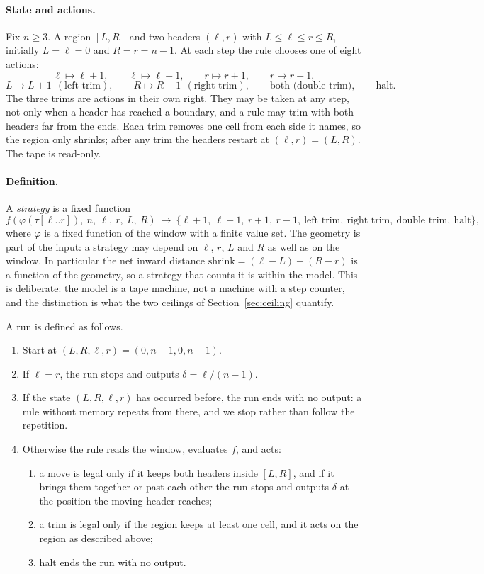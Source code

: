 \documentclass[11pt]{article}
\theoremstyle{remark}
\begin{document}
\paragraph{State and actions.} Fix $n\ge3$. A region $[L,R]$ and two headers $(\ell,r)$ with
$L\le\ell\le r\le R$, initially $L=\ell=0$ and $R=r=n-1$. At each step the rule chooses one of eight
actions:
\[
\ell\mapsto\ell+1,\qquad \ell\mapsto\ell-1,\qquad r\mapsto r+1,\qquad r\mapsto r-1,
\]
\[
L\mapsto L+1\ \ (\text{left trim}),\qquad R\mapsto R-1\ \ (\text{right trim}),\qquad
\text{both (double trim)},\qquad \text{halt}.
\]
The three trims are actions in their own right. They may be taken at any step, not only when a
header has reached a boundary, and a rule may trim with both headers far from the ends. Each trim
removes one cell from each side it names, so the region only shrinks; after any trim the headers
restart at $(\ell,r)=(L,R)$. The tape is read-only.

\paragraph{Definition.} A \emph{strategy} is a fixed function
\[
f(\varphi(\tau[\ell..r]),\ n,\ \ell,\ r,\ L,\ R)\ \longrightarrow\
\{\ell{+}1,\ \ell{-}1,\ r{+}1,\ r{-}1,\ \text{left trim},\ \text{right trim},\ \text{double trim},\ \text{halt}\},
\]
where $\varphi$ is a fixed function of the window with a finite value set. The geometry is part of
the input: a strategy may depend on $\ell$, $r$, $L$ and $R$ as well as on the window. In particular
the net inward distance $\mathrm{shrink}=(\ell-L)+(R-r)$ is a function of the geometry, so a strategy
that counts it is within the model. This is deliberate: the model is a tape machine, not a machine
with a step counter, and the distinction is what the two ceilings of Section~\ref{sec:ceiling}
quantify.

A run is defined as follows.
\begin{enumerate}
\item Start at $(L,R,\ell,r)=(0,n-1,0,n-1)$.
\item If $\ell=r$, the run stops and outputs $\delta=\ell/(n-1)$.
\item If the state $(L,R,\ell,r)$ has occurred before, the run ends with no output: a rule without
memory repeats from there, and we stop rather than follow the repetition.
\item Otherwise the rule reads the window, evaluates $f$, and acts:
\begin{enumerate}
\item a move is legal only if it keeps both headers inside $[L,R]$, and if it brings them together or
past each other the run stops and outputs $\delta$ at the position the moving header reaches;
\item a trim is legal only if the region keeps at least one cell, and it acts on the region as
described above;
\item halt ends the run with no output.
\end{enumerate}
\end{enumerate}
\end{document}
